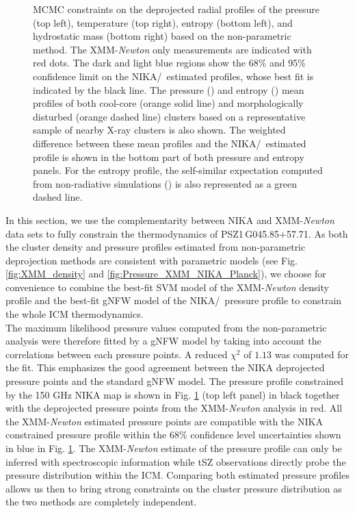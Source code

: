 \documentclass[traditabstract]{aa}
\begin{document}
\begin{figure}[h]
\caption{{\footnotesize MCMC constraints on the deprojected radial profiles of the pressure (top left), temperature (top right), entropy (bottom left), and hydrostatic mass (bottom right) based on the non-parametric method. The XMM-{\it Newton} only measurements are indicated with red dots. The dark and light blue regions show the 68\% and 95\% confidence limit on the NIKA/\planck\ estimated profiles, whose best fit is indicated by the black line. The pressure (\citealt{universal}) and entropy (\citealt{entropy_REXCESS}) mean profiles of both cool-core (orange solid line) and morphologically disturbed (orange dashed line) clusters based on a representative sample of nearby X-ray clusters is also shown. The weighted difference between these mean profiles and the NIKA/\planck\ estimated profile is shown in the bottom part of both pressure and entropy panels. For the entropy profile, the self-similar expectation computed from non-radiative simulations (\citealt{entropy_base}) is also represented as a green dashed line.}}
\label{fig:thermo_NIKA}
\end{figure}
In this section, we use the complementarity between NIKA and XMM-{\it Newton} data sets to fully constrain the thermodynamics of \mbox{PSZ1\,G045.85+57.71}. As both the cluster density and pressure profiles estimated from non-parametric deprojection methods are consistent with parametric models (see Fig. \ref{fig:XMM_density} and \ref{fig:Pressure_XMM_NIKA_Planck}), we choose for convenience to combine the best-fit SVM model of the XMM-{\it Newton} density profile and the best-fit gNFW model of the NIKA/\planck\ pressure profile to constrain the whole ICM thermodynamics.\\ 
\indent The maximum likelihood pressure values computed from the non-parametric analysis were therefore fitted by a gNFW model by taking into account the correlations between each pressure points. A reduced $\chi^2$ of $1.13$ was computed for the fit. This emphasizes the good agreement between the NIKA deprojected pressure points and the standard gNFW model. The pressure profile constrained by the 150 GHz NIKA map is shown in Fig. \ref{fig:thermo_NIKA} (top left panel) in black together with the deprojected pressure points from the XMM-{\it Newton} analysis in red. All the XMM-{\it Newton} estimated pressure points are compatible with the NIKA constrained pressure profile within the 68\% confidence level uncertainties shown in blue in Fig. \ref{fig:thermo_NIKA}. The XMM-{\it Newton} estimate of the pressure profile can only be inferred with spectroscopic information while tSZ observations directly probe the pressure distribution within the ICM. Comparing both estimated pressure profiles allows us then to bring strong constraints on the cluster pressure distribution as the two methods are completely independent.\\
\end{document}
